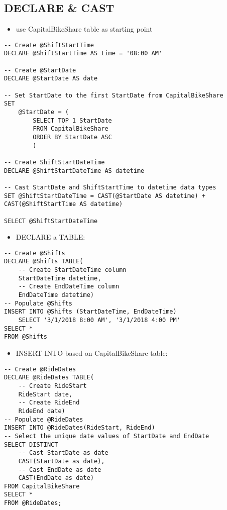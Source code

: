 \documentclass[]{book}
\providecommand{\tightlist}{%
  \setlength{\itemsep}{0pt}\setlength{\parskip}{0pt}}
\begin{document}
\hypertarget{declare-cast}{%
\subsection{DECLARE \& CAST}\label{declare-cast}}

\begin{itemize}
\tightlist
\item
  use CapitalBikeShare table as starting point
\end{itemize}

\begin{verbatim}
-- Create @ShiftStartTime
DECLARE @ShiftStartTime AS time = '08:00 AM'

-- Create @StartDate
DECLARE @StartDate AS date

-- Set StartDate to the first StartDate from CapitalBikeShare
SET 
	@StartDate = (
    	SELECT TOP 1 StartDate 
    	FROM CapitalBikeShare 
    	ORDER BY StartDate ASC
		)

-- Create ShiftStartDateTime
DECLARE @ShiftStartDateTime AS datetime

-- Cast StartDate and ShiftStartTime to datetime data types
SET @ShiftStartDateTime = CAST(@StartDate AS datetime) + CAST(@ShiftStartTime AS datetime) 

SELECT @ShiftStartDateTime
\end{verbatim}

\begin{itemize}
\tightlist
\item
  DECLARE a TABLE:
\end{itemize}

\begin{verbatim}
-- Create @Shifts
DECLARE @Shifts TABLE(
    -- Create StartDateTime column
	StartDateTime datetime,
    -- Create EndDateTime column
	EndDateTime datetime)
-- Populate @Shifts
INSERT INTO @Shifts (StartDateTime, EndDateTime)
	SELECT '3/1/2018 8:00 AM', '3/1/2018 4:00 PM' 
SELECT * 
FROM @Shifts
\end{verbatim}

\begin{itemize}
\tightlist
\item
  INSERT INTO \citet{TABLE} based on CapitalBikeShare table:
\end{itemize}

\begin{verbatim}
-- Create @RideDates
DECLARE @RideDates TABLE(
    -- Create RideStart
	RideStart date,
    -- Create RideEnd
	RideEnd date)
-- Populate @RideDates
INSERT INTO @RideDates(RideStart, RideEnd)
-- Select the unique date values of StartDate and EndDate
SELECT DISTINCT
    -- Cast StartDate as date
	CAST(StartDate as date),
    -- Cast EndDate as date
	CAST(EndDate as date) 
FROM CapitalBikeShare 
SELECT * 
FROM @RideDates;
\end{verbatim}
\end{document}
